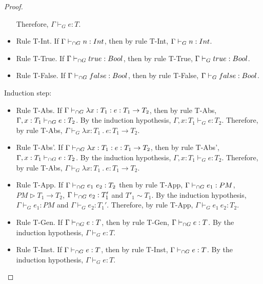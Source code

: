 \documentclass[a4paper]{article}
\begin{document}
\begin{proof}
\begin{itemize}
    Therefore, $\Gamma \vdash_{G} e : T$.
    \item Rule T-Int.
    If $\Gamma \vdash_{\cap G} n : {Int}$, then by rule T-Int, $\Gamma \vdash_{G} n : {Int}$.
    \item Rule T-True.
    If $\Gamma \vdash_{\cap G} true : Bool$, then by rule T-True, $\Gamma \vdash_{G} true : Bool$.
    \item Rule T-False.
    If $\Gamma \vdash_{\cap G} false : Bool$, then by rule T-False, $\Gamma \vdash_{G} false : Bool$.
\end{itemize}
Induction step:
\begin{itemize}
    \item Rule T-Abs.
    If $\Gamma \vdash_{\cap G} \lambda x : T_1 : e : T_1 \rightarrow T_2$, then by rule T-Abs, $\Gamma, x : T_1 \vdash_{\cap G} e : T_2$.
    By the induction hypothesis, $\Gamma, x : T_1 \vdash_{G} e : T_2$.
    Therefore, by rule T-Abs, $\Gamma \vdash_{G} \lambda x : T_1\ .\ e : T_1 \rightarrow T_2$.
    \item Rule T-Abs'.
    If $\Gamma \vdash_{\cap G} \lambda x : T_1 : e : T_1 \rightarrow T_2$, then by rule T-Abs', $\Gamma, x : T_1 \vdash_{\cap G} e : T_2$.
    By the induction hypothesis, $\Gamma, x : T_1 \vdash_{G} e : T_2$.
    Therefore, by rule T-Abs, $\Gamma \vdash_{G} \lambda x : T_1\ .\ e : T_1 \rightarrow T_2$.
    \item Rule T-App.
    If $\Gamma \vdash_{\cap G} e_1\ e_2 : T_2$ then by rule T-App, $\Gamma \vdash_{\cap G} e_1 : PM$, $PM \rhd T_1 \rightarrow T_2$, $\Gamma \vdash_{\cap G} e_2 : T'_1$ and $T'_1 \sim T_1$.
    By the induction hypothesis, $\Gamma \vdash_{G} e_1 : PM$ and $\Gamma \vdash_{G} e_2 : T_1'$.
    Therefore, by rule T-App, $\Gamma \vdash_{G} e_1\ e_2 : T_2$.
    \item Rule T-Gen.
    If $\Gamma \vdash_{\cap G} e : T$, then by rule T-Gen, $\Gamma \vdash_{\cap G} e : T$.
    By the induction hypothesis, $\Gamma \vdash_{G} e : T$.
    \item Rule T-Inst.
    If $\Gamma \vdash_{\cap G} e : T$, then by rule T-Inst, $\Gamma \vdash_{\cap G} e : T$.
    By the induction hypothesis, $\Gamma \vdash_{G} e : T$.
\end{itemize}
\end{proof}
\end{document}
